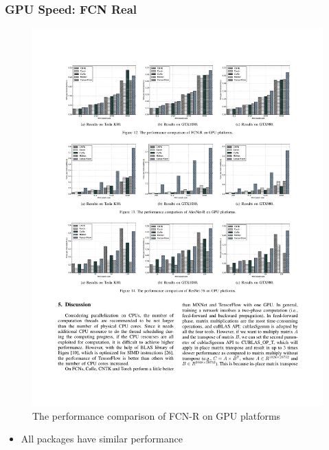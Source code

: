 
\begin{frame}
	\MyLogo
	\frametitle{GPU Speed: FCN Real}
	
	\begin{figure}[htbp] 
		\includegraphics[width=\linewidth]{figures/FCN-R2.pdf} 
		\caption{The performance comparison of FCN-R on GPU platforms}
	\end{figure}

\pause

\vskip -10pt
\begin{mdframed}[style=mystyle1]
\begin{itemize}
\item All packages have similar performance
\end{itemize}
\end{mdframed}

\end{frame}


